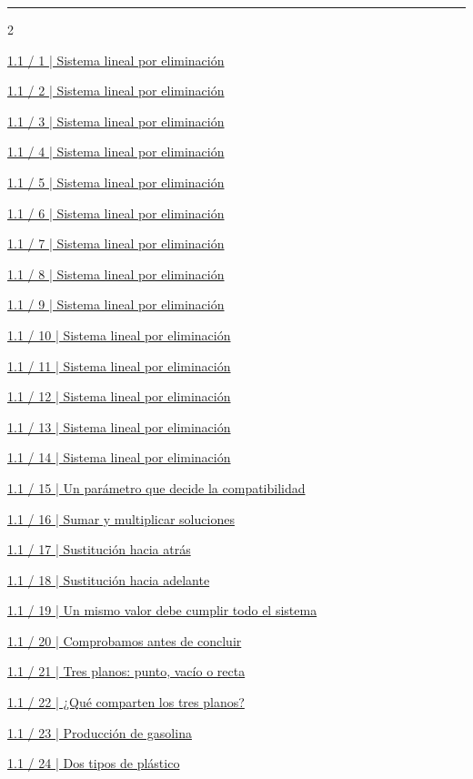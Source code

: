 \documentclass[11pt,a4paper,landscape]{article}
\newcommand{\titulo}[1]{{\LARGE\bfseries #1}\par\smallskip\hrule\medskip}
\begin{document}
\newpage\titulo{Índice de ejercicios}
\begin{multicols}{2}

\hyperlink{1.1-1}{1.1 / 1 | Sistema lineal por eliminación}\par
\hyperlink{1.1-2}{1.1 / 2 | Sistema lineal por eliminación}\par
\hyperlink{1.1-3}{1.1 / 3 | Sistema lineal por eliminación}\par
\hyperlink{1.1-4}{1.1 / 4 | Sistema lineal por eliminación}\par
\hyperlink{1.1-5}{1.1 / 5 | Sistema lineal por eliminación}\par
\hyperlink{1.1-6}{1.1 / 6 | Sistema lineal por eliminación}\par
\hyperlink{1.1-7}{1.1 / 7 | Sistema lineal por eliminación}\par
\hyperlink{1.1-8}{1.1 / 8 | Sistema lineal por eliminación}\par
\hyperlink{1.1-9}{1.1 / 9 | Sistema lineal por eliminación}\par
\hyperlink{1.1-10}{1.1 / 10 | Sistema lineal por eliminación}\par
\hyperlink{1.1-11}{1.1 / 11 | Sistema lineal por eliminación}\par
\hyperlink{1.1-12}{1.1 / 12 | Sistema lineal por eliminación}\par
\hyperlink{1.1-13}{1.1 / 13 | Sistema lineal por eliminación}\par
\hyperlink{1.1-14}{1.1 / 14 | Sistema lineal por eliminación}\par
\hyperlink{1.1-15}{1.1 / 15 | Un parámetro que decide la compatibilidad}\par
\hyperlink{1.1-16}{1.1 / 16 | Sumar y multiplicar soluciones}\par
\hyperlink{1.1-17}{1.1 / 17 | Sustitución hacia atrás}\par
\hyperlink{1.1-18}{1.1 / 18 | Sustitución hacia adelante}\par
\hyperlink{1.1-19}{1.1 / 19 | Un mismo valor debe cumplir todo el sistema}\par
\hyperlink{1.1-20}{1.1 / 20 | Comprobamos antes de concluir}\par
\hyperlink{1.1-21}{1.1 / 21 | Tres planos: punto, vacío o recta}\par
\hyperlink{1.1-22}{1.1 / 22 | ¿Qué comparten los tres planos?}\par
\hyperlink{1.1-23}{1.1 / 23 | Producción de gasolina}\par
\hyperlink{1.1-24}{1.1 / 24 | Dos tipos de plástico}\par

\end{multicols}
\end{document}

